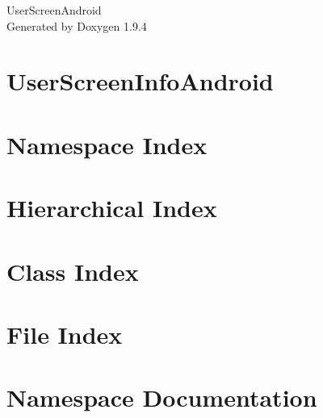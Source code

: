\documentclass[twoside]{book}
\newcommand{\+}{\discretionary{\mbox{\scriptsize$\hookleftarrow$}}{}{}}
\newcommand{\clearemptydoublepage}{%
    \newpage{\pagestyle{empty}\cleardoublepage}%
  }
\begin{document}
  \raggedbottom
    \hypersetup{pageanchor=false,
                bookmarksnumbered=true,
                pdfencoding=unicode
               }
  \begin{titlepage}
  \vspace*{7cm}
  \begin{center}%
  {\Large User\+Screen\+Android}\\
  \vspace*{1cm}
  {\large Generated by Doxygen 1.9.4}\\
  \end{center}
  \end{titlepage}
  \clearemptydoublepage
  \tableofcontents
  \clearemptydoublepage
  \hypersetup{pageanchor=true}
\chapter{User\+Screen\+Info\+Android}
\label{md__r_e_a_d_m_e}

\chapter{Namespace Index}

\chapter{Hierarchical Index}

\chapter{Class Index}

\chapter{File Index}

\chapter{Namespace Documentation}





\end{document}
